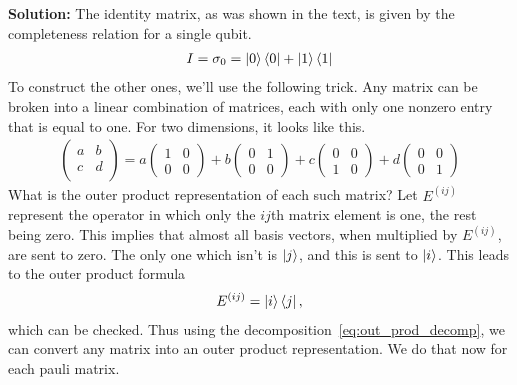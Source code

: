 \documentclass{book}
\begin{document}
    \textbf{Solution:} The identity matrix, as was shown in the text, is given by the completeness relation for a single qubit.
    \begin{align}
        I = \sigma_0  = \ket{0}\bra{0} + \ket{1}\bra{1}
    \end{align}
    To construct the other ones, we'll use the following trick. Any matrix can be broken into a linear combination of matrices, each with only one nonzero entry that is equal to one. For two dimensions, it looks like this.
    \begin{align} \label{eq:out_prod_decomp}
        \begin{pmatrix}
            a & b \\
            c & d \\
        \end{pmatrix}
        = a
        \begin{pmatrix}
            1 & 0 \\
            0 & 0
        \end{pmatrix}
        + b 
        \begin{pmatrix}
            0 & 1 \\
            0 & 0
        \end{pmatrix}
        + c
        \begin{pmatrix}
            0 & 0 \\
            1 & 0
        \end{pmatrix}
        + d
        \begin{pmatrix}
            0 & 0 \\
            0 & 1
        \end{pmatrix}
    \end{align}
    What is the outer product representation of each such matrix? Let $E^{(ij)}$ represent the operator in which only the $ij$th matrix element is one, the rest being zero. This implies that almost all basis vectors, when multiplied by $E^{(ij)}$, are sent to zero. The only one which isn't is $\ket{j}$, and this is sent to $\ket{i}$. This leads to the outer product formula
    \begin{align}
        E^{(ij)} = \ket{i}\bra{j},
    \end{align}
    which can be checked. Thus using the decomposition~\eqref{eq:out_prod_decomp}, we can convert any matrix into an outer product representation. We do that now for each pauli matrix.
\end{document}
